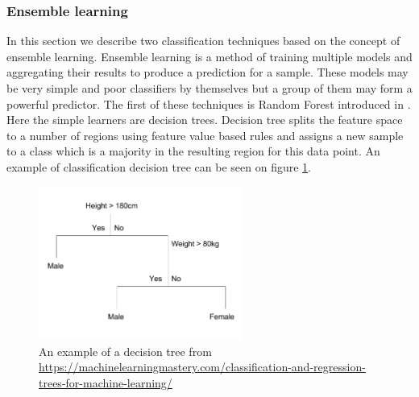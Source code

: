 \documentclass[12pt, wide]{mwart}
\begin{document}
\subsubsection{Ensemble learning}

In this section we describe two classification techniques based on the concept of ensemble learning. Ensemble learning is a method of training multiple models and aggregating their results to produce a prediction for a sample. These models may be very simple and poor classifiers by themselves but a group of them may form a powerful predictor. The first of these techniques is Random Forest introduced in \cite{RF}. Here the simple learners are decision trees. Decision tree splits the feature space to a number of regions using feature value based rules and assigns a new sample to a class which is a majority in the resulting region for this data point. An example of classification decision tree can be seen on figure \ref{fig:decision-tree}.

\begin{figure}
\centering
\includegraphics[width=0.6\textwidth]{images/decision_tree.png}
\caption{An example of a decision tree from \url{https://machinelearningmastery.com/classification-and-regression-trees-for-machine-learning/}}
\label{fig:decision-tree}
\end{figure}
\end{document}
